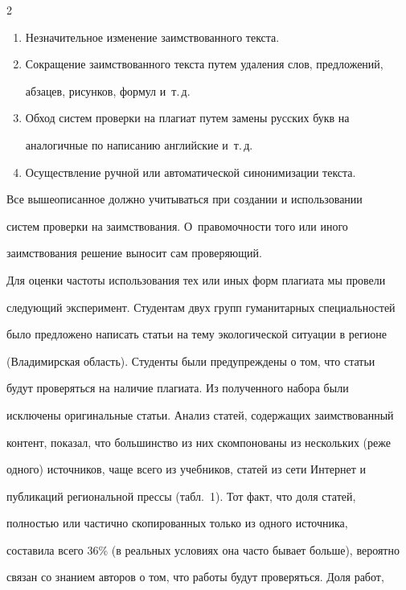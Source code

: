 \begin{multicols}{2}
\begin{enumerate}[1.]
оригинальном тексте и~т.\,д.

  \item Незначительное изменение заимствованного текста.

\item  Сокращение заимствованного текста путем удаления слов, предложений, 

абзацев, рисунков, формул и~т.\,д.

  \item Обход сис\-тем проверки на плагиат путем замены русских букв на 

аналогичные по написанию английские и~т.\,д.

  \item Осуществление ручной или автоматической синонимизации текста.

  \end{enumerate}

  

  Все вышеописанное должно учитываться при создании и использовании 

  сис\-тем проверки на заимствования. О~правомочности того или иного 

заимствования решение выносит сам проверяющий.

  

  Для оценки частоты использования тех или иных форм плагиата мы провели 

следующий эксперимент. Студентам двух групп гуманитарных специальностей 

было предложено написать статьи на тему экологической ситуации в регионе 

(Владимирская область). Студенты были предупреждены о том, что статьи 

будут проверяться на наличие плагиата. Из полученного набора были 

исключены оригинальные статьи. Анализ статей, содержащих заимствованный 

контент, показал, что большинство из них скомпонованы из нескольких (реже 

одного) источников, чаще всего из учебников, статей из сети Интернет и 

публикаций региональной прессы (табл.~1). Тот факт, что доля статей, 

полностью или частично скопированных только из одного источника, 

составила всего 36\% (в реальных условиях она часто бывает больше), вероятно 

связан со знанием авторов о том, что работы будут проверяться. Доля работ, 


\end{multicols}
